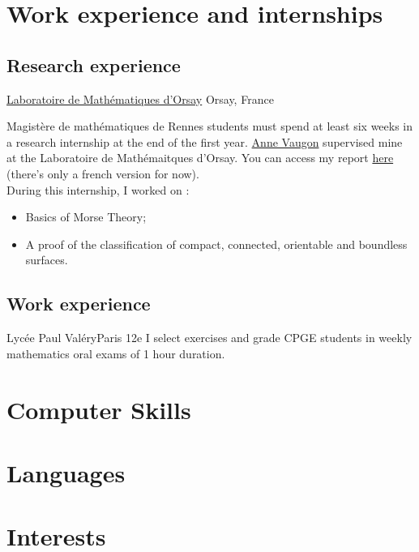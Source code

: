 \documentclass[11pt,letterpaper,sans]{moderncv}
\begin{document}
\section{Work experience and internships}

\subsection{Research experience}
{\href{https://www.imo.universite-paris-saclay.fr/fr/}{Laboratoire de Mathématiques d'Orsay}}
{Orsay, France}{}{
	Magistère de mathématiques de Rennes students must spend at least six weeks in a research internship 
	at the end of the first year. \href{https://anne.vaugon.vwx.fr/}{Anne Vaugon} supervised mine at the 
	Laboratoire de Mathémaitques d'Orsay. 
	You can access my report \color{newred} 
	\href{https://perso.eleves.ens-rennes.fr/people/amar.ahmane/src/rapports/stage-l3.pdf}{here} 
	\color{black} (there's only a french version for now).\\
	During this internship, I worked on : 
	\begin{itemize}
		\item Basics of Morse Theory; 
		\item A proof of the classification of compact, connected, orientable and boundless
		surfaces.\\
		\vspace{1em} 
		\begin{center}
			
		\end{center}
	\end{itemize}
}

\subsection{Work experience}
{Lycée Paul Valéry}{Paris 12e}{}{
	I select exercises and grade CPGE students in weekly mathematics oral exams
	of 1 hour duration. 
}


\section{Computer Skills}

\section{Languages}

\section{Interests}
\end{document}
